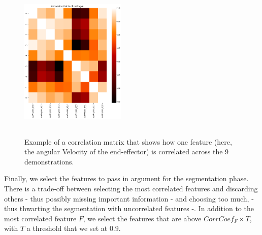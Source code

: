 \documentclass[conference]{IEEEtran}
\begin{document}
\begin{figure}[t]
  \centering
  \includegraphics[width=0.45\textwidth, height = 3in]{img/resolCorrMap.png}
  \caption{Example of a correlation matrix that shows how one feature (here, the angular Velocity of the end-effector) is correlated across the 9 demonstrations.}
  \label{fig:corrMat}
\end{figure}

Finally, we select the features to pass in argument for the segmentation phase. There is a trade-off between selecting the most correlated features and discarding others - thus possibly missing important information - and choosing too much, - thus thwarting the segmentation with uncorrelated features -. In  addition to the most correlated feature $F$, we select the features that are above $CorrCoef_{F} \times T$, with $T$ a threshold that we set at $0.9$. \newline
\end{document}
